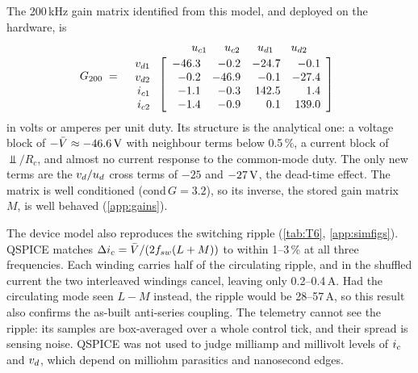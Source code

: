 The 200\,kHz gain matrix identified from this model, and deployed on the hardware, is
\begin{equation}
  G_{200} \;=\;
  \begin{array}{r@{\;}c}
   & \begin{array}{rrrr} \;\;u_{c1} & \;\;u_{c2} & \;\;u_{d1} & \;\;u_{d2} \end{array}\\[2pt]
  \begin{array}{r} v_{d1}\\ v_{d2}\\ i_{c1}\\ i_{c2} \end{array} &
  \left[\begin{array}{rrrr} -46.3 & -0.2 & -24.7 & -0.1\\ -0.2 & -46.9 & -0.1 & -27.4\\ -1.1 & -0.3 & 142.5 & 1.4\\ -1.4 & -0.9 & 0.1 & 139.0 \end{array}\right]
  \end{array}
  \label{eq:G200}
\end{equation}
in volts or amperes per unit duty. Its structure is the analytical one: a voltage block of $-\bar{V} \approx -46.6\,\mathrm{V}$ with neighbour terms below 0.5\,\%, a current block of $\Vbar/R_c$, and almost no current response to the common-mode duty. The only new terms are the $v_{d}/u_{d}$ cross terms of $-25$ and $-27\,\mathrm{V}$, the dead-time effect. The matrix is well conditioned (cond$\,G = 3.2$), so its inverse, the stored gain matrix $M$, is well behaved (\cref{app:gains}).

The device model also reproduces the switching ripple (\cref{tab:T6}, \cref{app:simfigs}). QSPICE matches $\Delta i_{c} = \bar{V}/(2f_{sw}(L+M))$ to within 1--3\,\% at all three frequencies. Each winding carries half of the circulating ripple, and in the shuffled current the two interleaved windings cancel, leaving only 0.2--0.4\,A. Had the circulating mode seen $L-M$ instead, the ripple would be 28--57\,A, so this result also confirms the as-built anti-series coupling. The telemetry cannot see the ripple: its samples are box-averaged over a whole control tick, and their spread is sensing noise. QSPICE was not used to judge milliamp and millivolt levels of $i_{c}$ and $v_{d}$, which depend on milliohm parasitics and nanosecond edges.


